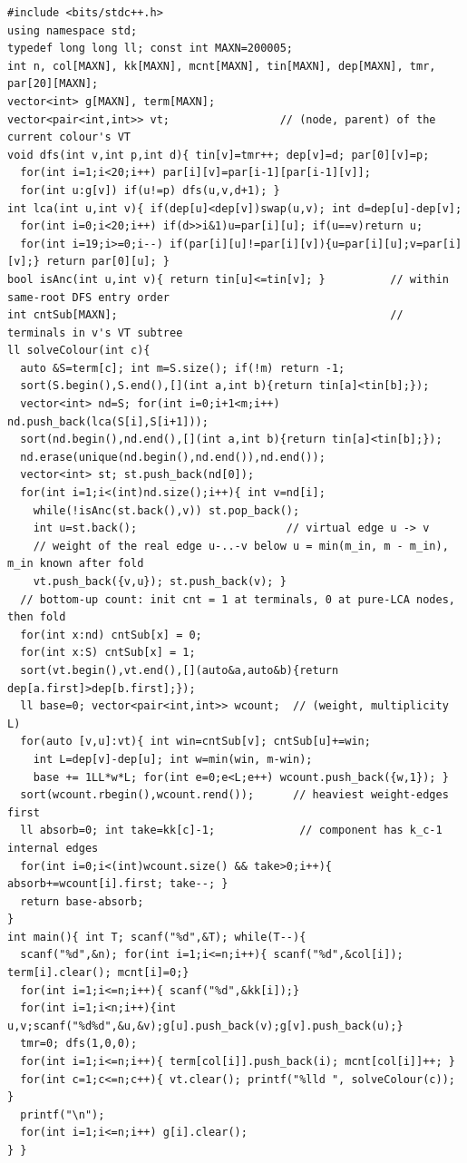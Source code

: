 \begin{lstlisting}[caption={CF 2252F via per-colour virtual tree + count DP + greedy absorb. For each colour build its virtual tree, fold terminal counts, each virtual edge (u,v) has weight min(cnt[v], m minus cnt[v]) repeated L = depth[v]-depth[u] times; answer = sum of weights minus the (k-1) heaviest. ASCII only}, label={lst:c30-spectral}]
#include <bits/stdc++.h>
using namespace std;
typedef long long ll; const int MAXN=200005;
int n, col[MAXN], kk[MAXN], mcnt[MAXN], tin[MAXN], dep[MAXN], tmr, par[20][MAXN];
vector<int> g[MAXN], term[MAXN];
vector<pair<int,int>> vt;                 // (node, parent) of the current colour's VT
void dfs(int v,int p,int d){ tin[v]=tmr++; dep[v]=d; par[0][v]=p;
  for(int i=1;i<20;i++) par[i][v]=par[i-1][par[i-1][v]];
  for(int u:g[v]) if(u!=p) dfs(u,v,d+1); }
int lca(int u,int v){ if(dep[u]<dep[v])swap(u,v); int d=dep[u]-dep[v];
  for(int i=0;i<20;i++) if(d>>i&1)u=par[i][u]; if(u==v)return u;
  for(int i=19;i>=0;i--) if(par[i][u]!=par[i][v]){u=par[i][u];v=par[i][v];} return par[0][u]; }
bool isAnc(int u,int v){ return tin[u]<=tin[v]; }          // within same-root DFS entry order
int cntSub[MAXN];                                          // terminals in v's VT subtree
ll solveColour(int c){
  auto &S=term[c]; int m=S.size(); if(!m) return -1;
  sort(S.begin(),S.end(),[](int a,int b){return tin[a]<tin[b];});
  vector<int> nd=S; for(int i=0;i+1<m;i++) nd.push_back(lca(S[i],S[i+1]));
  sort(nd.begin(),nd.end(),[](int a,int b){return tin[a]<tin[b];});
  nd.erase(unique(nd.begin(),nd.end()),nd.end());
  vector<int> st; st.push_back(nd[0]);
  for(int i=1;i<(int)nd.size();i++){ int v=nd[i];
    while(!isAnc(st.back(),v)) st.pop_back();
    int u=st.back();                       // virtual edge u -> v
    // weight of the real edge u-..-v below u = min(m_in, m - m_in), m_in known after fold
    vt.push_back({v,u}); st.push_back(v); }
  // bottom-up count: init cnt = 1 at terminals, 0 at pure-LCA nodes, then fold
  for(int x:nd) cntSub[x] = 0;
  for(int x:S) cntSub[x] = 1;
  sort(vt.begin(),vt.end(),[](auto&a,auto&b){return dep[a.first]>dep[b.first];});
  ll base=0; vector<pair<int,int>> wcount;  // (weight, multiplicity L)
  for(auto [v,u]:vt){ int win=cntSub[v]; cntSub[u]+=win;
    int L=dep[v]-dep[u]; int w=min(win, m-win);
    base += 1LL*w*L; for(int e=0;e<L;e++) wcount.push_back({w,1}); }
  sort(wcount.rbegin(),wcount.rend());      // heaviest weight-edges first
  ll absorb=0; int take=kk[c]-1;             // component has k_c-1 internal edges
  for(int i=0;i<(int)wcount.size() && take>0;i++){ absorb+=wcount[i].first; take--; }
  return base-absorb;
}
int main(){ int T; scanf("%d",&T); while(T--){
  scanf("%d",&n); for(int i=1;i<=n;i++){ scanf("%d",&col[i]); term[i].clear(); mcnt[i]=0;}
  for(int i=1;i<=n;i++){ scanf("%d",&kk[i]);}
  for(int i=1;i<n;i++){int u,v;scanf("%d%d",&u,&v);g[u].push_back(v);g[v].push_back(u);}
  tmr=0; dfs(1,0,0);
  for(int i=1;i<=n;i++){ term[col[i]].push_back(i); mcnt[col[i]]++; }
  for(int c=1;c<=n;c++){ vt.clear(); printf("%lld ", solveColour(c)); }
  printf("\n");
  for(int i=1;i<=n;i++) g[i].clear();
} }
\end{lstlisting}

